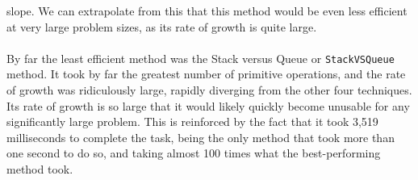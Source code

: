\documentclass[a4paper]{article}
\begin{document}
slope. 
We can extrapolate from this that this method would be even less efficient at very large problem sizes, as its rate of growth 
is quite large. 
\\\\
By far the least efficient method was the Stack versus Queue or \verb|StackVSQueue| method.
It took by far the greatest number of primitive operations, and the rate of growth was ridiculously large, rapidly diverging from 
the other four techniques.
Its rate of growth is so large that it would likely quickly become unusable for any significantly large problem. 
This is reinforced by the fact that it took 3,519 milliseconds to complete the task, being the only method that took more than one 
second to do so, and taking almost 100 times what the best-performing method took.
\end{document}
